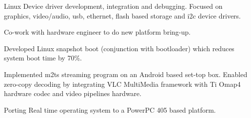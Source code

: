 \documentclass[letterpaper]{deedy-resume} %
\begin{document}
\begin{minipage}[t]{0.66\textwidth}
\sectionspace %



\begin{tightitemize}
\item Linux Device driver development, integration and debugging. Focused on graphics, video/audio, usb, ethernet, flash based storage and i2c device drivers.
\item Co-work with hardware engineer to do new platform bring-up.
\item Developed Linux snapshot boot (conjunction with bootloader) which reduces system boot time by 70\%.
\item Implemented m2ts streaming program on an Android based set-top box. Enabled zero-copy decoding by integrating VLC MultiMedia framework with Ti Omap4 hardware codec and video pipelines hardware.
\item Porting Real time operating system to a PowerPC 405 based platform.
\end{tightitemize}

\sectionspace %



\end{minipage} %


\begin{minipage}[t]{0.33\textwidth} %
\end{minipage}
\hfill

\end{document}

